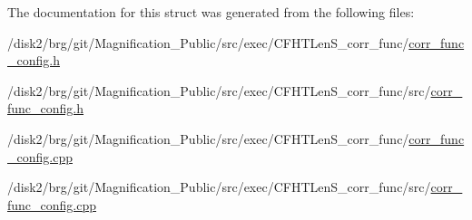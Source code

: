 The documentation for this struct was generated from the following files\-:\begin{DoxyCompactItemize}
\item 
/disk2/brg/git/\-Magnification\-\_\-\-Public/src/exec/\-C\-F\-H\-T\-Len\-S\-\_\-corr\-\_\-func/\hyperlink{corr__func__config_8h}{corr\-\_\-func\-\_\-config.\-h}\item 
/disk2/brg/git/\-Magnification\-\_\-\-Public/src/exec/\-C\-F\-H\-T\-Len\-S\-\_\-corr\-\_\-func/src/\hyperlink{src_2corr__func__config_8h}{corr\-\_\-func\-\_\-config.\-h}\item 
/disk2/brg/git/\-Magnification\-\_\-\-Public/src/exec/\-C\-F\-H\-T\-Len\-S\-\_\-corr\-\_\-func/\hyperlink{corr__func__config_8cpp}{corr\-\_\-func\-\_\-config.\-cpp}\item 
/disk2/brg/git/\-Magnification\-\_\-\-Public/src/exec/\-C\-F\-H\-T\-Len\-S\-\_\-corr\-\_\-func/src/\hyperlink{src_2corr__func__config_8cpp}{corr\-\_\-func\-\_\-config.\-cpp}\end{DoxyCompactItemize}
